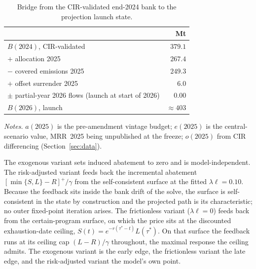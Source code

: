 \documentclass[11pt,letterpaper]{article}
\theoremstyle{plain}
\theoremstyle{definition}
\numberwithin{equation}{section}
\begin{document}
\begin{table}[H]\centering
\caption{Bridge from the CIR-validated end-2024 bank to the projection launch state.}
\label{tab:bridge}
\footnotesize
\begin{tabular}{@{}l r@{}}
\toprule
 & Mt\\
\midrule
$B(2024)$, CIR-validated & $379.1$\\
$+$ allocation 2025 & $267.4$\\
$-$ covered emissions 2025 & $249.3$\\
$+$ offset surrender 2025 & $6.0$\\
$\pm$ partial-year 2026 flows (launch at start of 2026) & $0.00$\\
\midrule
$B(2026)$, launch & $\approx 403$\\
\bottomrule
\end{tabular}

\smallskip
{\footnotesize\justifying
\textit{Notes.} $a(2025)$ is the pre-amendment vintage budget; $e(2025)$ is the central-scenario value, MRR~2025 being unpublished at the freeze; $o(2025)$ from CIR differencing (Section~\ref{sec:data}).\par}
\end{table}
The exogenous variant sets induced abatement to zero and is model-independent. The risk-adjusted variant feeds back the incremental abatement $[\min\{S,L\}-R]^{+}/\gamma$ from the self-consistent surface at the fitted $\lambda\ell=0.10$. Because the feedback sits inside the bank drift of the solve, the surface is self-consistent in the state by construction and the projected path is its characteristic; no outer fixed-point iteration arises. The frictionless variant ($\lambda\ell=0$) feeds back from the certain-program surface, on which the price sits at the discounted exhaustion-date ceiling, $S(t)=e^{-r(\tau^{*}-t)}L(\tau^{*})$. On that surface the feedback runs at its ceiling cap $(L-R)/\gamma$ throughout, the maximal response the ceiling admits. The exogenous variant is the early edge, the frictionless variant the late edge, and the risk-adjusted variant the model's own point.
\end{document}
